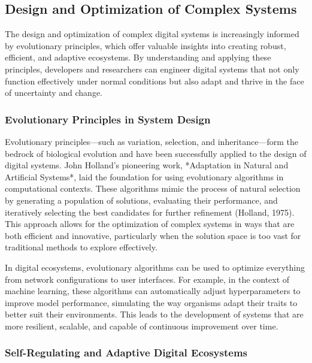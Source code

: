\documentclass[12pt,twoside]{article}
\begin{document}
\subsection{Design and Optimization of Complex Systems}

The design and optimization of complex digital systems is increasingly informed by evolutionary principles, which offer valuable insights into creating robust, efficient, and adaptive ecosystems. By understanding and applying these principles, developers and researchers can engineer digital systems that not only function effectively under normal conditions but also adapt and thrive in the face of uncertainty and change.


\subsubsection{Evolutionary Principles in System Design}

Evolutionary principles—such as variation, selection, and inheritance—form the bedrock of biological evolution and have been successfully applied to the design of digital systems. John Holland’s pioneering work, *Adaptation in Natural and Artificial Systems*, laid the foundation for using evolutionary algorithms in computational contexts. These algorithms mimic the process of natural selection by generating a population of solutions, evaluating their performance, and iteratively selecting the best candidates for further refinement (Holland, 1975). This approach allows for the optimization of complex systems in ways that are both efficient and innovative, particularly when the solution space is too vast for traditional methods to explore effectively.

In digital ecosystems, evolutionary algorithms can be used to optimize everything from network configurations to user interfaces. For example, in the context of machine learning, these algorithms can automatically adjust hyperparameters to improve model performance, simulating the way organisms adapt their traits to better suit their environments. This leads to the development of systems that are more resilient, scalable, and capable of continuous improvement over time.



\subsubsection{Self-Regulating and Adaptive Digital Ecosystems}
\end{document}

